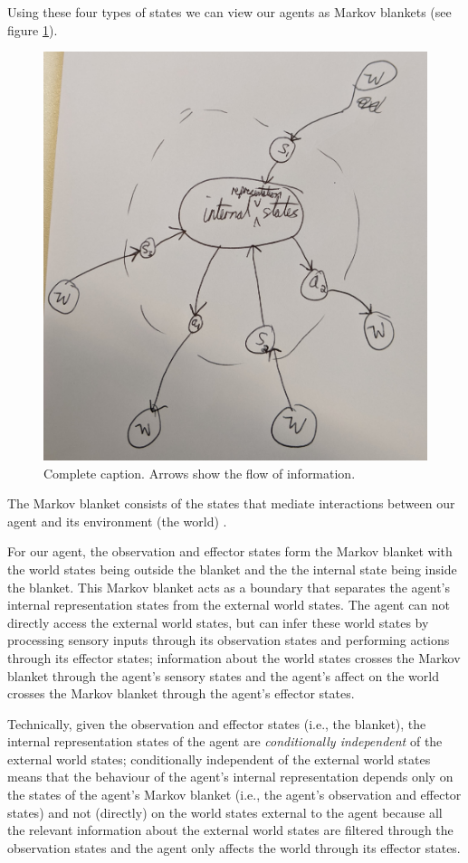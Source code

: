 Using these four types of states we can view our agents as Markov blankets (see figure \ref{fig:markov_blanket}).

\begin{figure}
    \centering
    \includegraphics[width=0.5\linewidth]{2MathematicalFramework/InitialFramework/Images/markov_blanket.jpg}
    \caption{
        Complete caption.
        Arrows show the flow of information.
    }
    \label{fig:markov_blanket}
\end{figure}

The Markov blanket consists of the states that mediate interactions between our agent and its environment (the world) \cite{Ramstead2020}.

For our agent, the observation and effector states form the Markov blanket with the world states being outside the blanket and the the internal state being inside the blanket.
This Markov blanket acts as a boundary that separates the agent's internal representation states from the external world states.
The agent can not directly access the external world states, but can infer these world states by processing sensory inputs through its observation states and performing actions through its effector states; information about the world states crosses the Markov blanket through the agent's sensory states and the agent's affect on the world crosses the Markov blanket through the agent's effector states.

Technically, given the observation and effector states (i.e., the blanket), the internal representation states of the agent are \emph{conditionally independent} of the external world states; conditionally independent of the external world states means that the behaviour of the agent's internal representation depends only on the states of the agent's Markov blanket (i.e., the agent's observation and effector states) and not (directly) on the world states external to the agent because all the relevant information about the external world states are filtered through the observation states and the agent only affects the world through its effector states.

